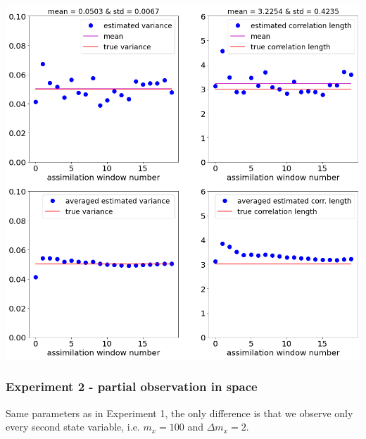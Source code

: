 \documentclass[a4paper,10pt]{article}
\numberwithin{equation}{section}
\begin{document}
\includegraphics[scale=0.4]{Ex1}

\newpage
\subsubsection*{Experiment 2 - partial observation in space}
Same parameters as in Experiment 1, the only difference is that we observe only every second state variable, i.e. $m_x=100$ and $\Delta m_x=2$. 
\end{document}
